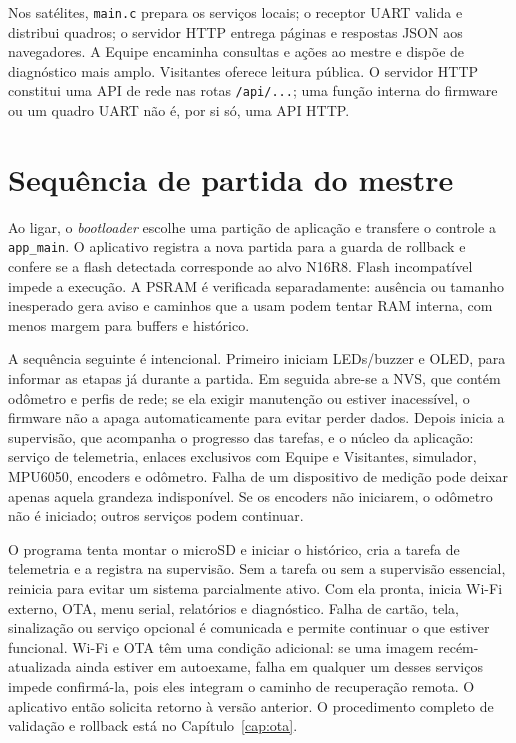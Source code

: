 Nos satélites, \texttt{main.c} prepara os serviços locais; o receptor UART valida e distribui quadros; o servidor HTTP entrega páginas e respostas JSON aos navegadores. A Equipe encaminha consultas e ações ao mestre e dispõe de diagnóstico mais amplo. Visitantes oferece leitura pública. O servidor HTTP constitui uma API de rede nas rotas \texttt{/api/...}; uma função interna do firmware ou um quadro UART não é, por si só, uma API HTTP.

\section{Sequência de partida do mestre}
Ao ligar, o \emph{bootloader} escolhe uma partição de aplicação e transfere o controle a \texttt{app\_main}. O aplicativo registra a nova partida para a guarda de rollback e confere se a flash detectada corresponde ao alvo N16R8. Flash incompatível impede a execução. A PSRAM é verificada separadamente: ausência ou tamanho inesperado gera aviso e caminhos que a usam podem tentar RAM interna, com menos margem para buffers e histórico.

A sequência seguinte é intencional. Primeiro iniciam LEDs/buzzer e OLED, para informar as etapas já durante a partida. Em seguida abre-se a NVS, que contém odômetro e perfis de rede; se ela exigir manutenção ou estiver inacessível, o firmware não a apaga automaticamente para evitar perder dados. Depois inicia a supervisão, que acompanha o progresso das tarefas, e o núcleo da aplicação: serviço de telemetria, enlaces exclusivos com Equipe e Visitantes, simulador, MPU6050, encoders e odômetro. Falha de um dispositivo de medição pode deixar apenas aquela grandeza indisponível. Se os encoders não iniciarem, o odômetro não é iniciado; outros serviços podem continuar.

O programa tenta montar o microSD e iniciar o histórico, cria a tarefa de telemetria e a registra na supervisão. Sem a tarefa ou sem a supervisão essencial, reinicia para evitar um sistema parcialmente ativo. Com ela pronta, inicia Wi-Fi externo, OTA, menu serial, relatórios e diagnóstico. Falha de cartão, tela, sinalização ou serviço opcional é comunicada e permite continuar o que estiver funcional. Wi-Fi e OTA têm uma condição adicional: se uma imagem recém-atualizada ainda estiver em autoexame, falha em qualquer um desses serviços impede confirmá-la, pois eles integram o caminho de recuperação remota. O aplicativo então solicita retorno à versão anterior. O procedimento completo de validação e rollback está no Capítulo~\ref{cap:ota}.


